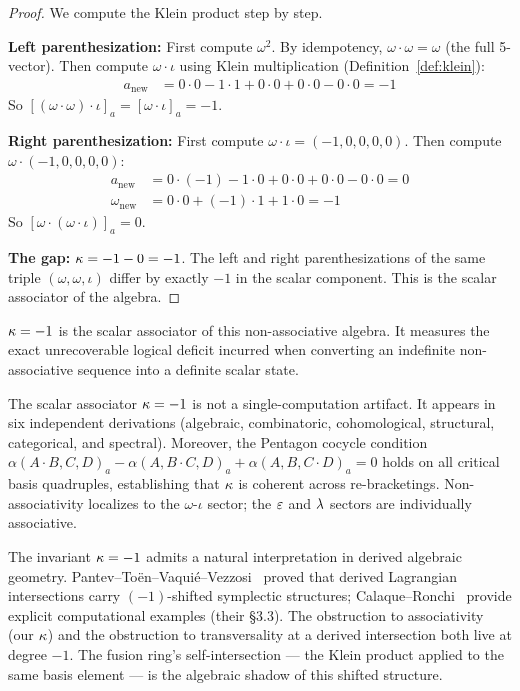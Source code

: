 \begin{proof}
We compute the Klein product step by step.

\textbf{Left parenthesization:} First compute $\omega^2$. By idempotency, $\omega \cdot \omega = \omega$ (the full 5-vector). Then compute $\omega \cdot \iota$ using Klein multiplication (Definition~\ref{def:klein}):
\begin{align*}
a_{\mathrm{new}} &= 0 \cdot 0 - 1 \cdot 1 + 0 \cdot 0 + 0 \cdot 0 - 0 \cdot 0 = -1
\end{align*}
So $[(\omega \cdot \omega) \cdot \iota]_a = [\omega \cdot \iota]_a = -1$.

\textbf{Right parenthesization:} First compute $\omega \cdot \iota = (-1, 0, 0, 0, 0)$. Then compute $\omega \cdot (-1, 0, 0, 0, 0)$:
\begin{align*}
a_{\mathrm{new}} &= 0 \cdot (-1) - 1 \cdot 0 + 0 \cdot 0 + 0 \cdot 0 - 0 \cdot 0 = 0 \\
\omega_{\mathrm{new}} &= 0 \cdot 0 + (-1) \cdot 1 + 1 \cdot 0 = -1
\end{align*}
So $[\omega \cdot (\omega \cdot \iota)]_a = 0$.

\textbf{The gap:} $\kappa = -1 - 0 = -1$. The left and right parenthesizations of the same triple $(\omega, \omega, \iota)$ differ by exactly $-1$ in the scalar component. This is the scalar associator of the algebra. \qedhere
\end{proof}

$\kappa = -1$ is the scalar associator of this non-associative algebra. It measures the exact unrecoverable logical deficit incurred when converting an indefinite non-associative sequence into a definite scalar state.

\begin{remark}
The scalar associator $\kappa = -1$ is not a single-computation artifact. It appears in six independent derivations (algebraic, combinatoric, cohomological, structural, categorical, and spectral). Moreover, the Pentagon cocycle condition $\alpha(A{\cdot}B, C, D)_a - \alpha(A, B{\cdot}C, D)_a + \alpha(A, B, C{\cdot}D)_a = 0$ holds on all critical basis quadruples, establishing that $\kappa$ is coherent across re-bracketings. Non-associativity localizes to the $\omega$-$\iota$ sector; the $\varepsilon$ and $\lambda$ sectors are individually associative.
\end{remark}

\begin{remark}
The invariant $\kappa = -1$ admits a natural interpretation in derived algebraic geometry. Pantev--To\"en--Vaqui\'e--Vezzosi~\cite{ptvv} proved that derived Lagrangian intersections carry $(-1)$-shifted symplectic structures; Calaque--Ronchi~\cite{calaque-ronchi} provide explicit computational examples (their \S3.3). The obstruction to associativity (our $\kappa$) and the obstruction to transversality at a derived intersection both live at degree $-1$. The fusion ring's self-intersection --- the Klein product applied to the same basis element --- is the algebraic shadow of this shifted structure.
\end{remark}

